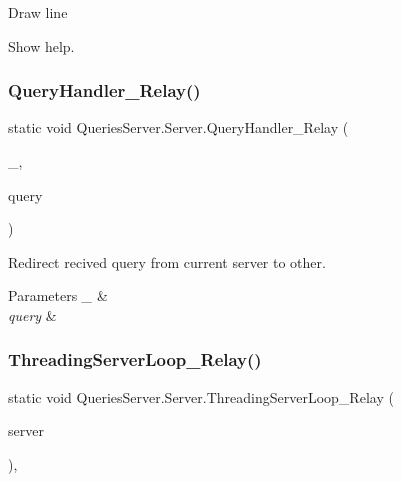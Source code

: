 Draw line

Show help. \mbox{\label{class_queries_server_1_1_server_af23657bf1fbf254abb46ed80180b0cc3}} 
\subsubsection{\texorpdfstring{Query\+Handler\+\_\+\+Relay()}{QueryHandler\_Relay()}}
{\footnotesize\ttfamily static void Queries\+Server.\+Server.\+Query\+Handler\+\_\+\+Relay (\begin{DoxyParamCaption}\item[{\mbox{\hyperlink{class_pipes_provider_1_1_server_1_1_transmission_controllers_1_1_base_server_transmission_controller}{Base\+Server\+Transmission\+Controller}}}]{\+\_\+,  }\item[{string}]{query }\end{DoxyParamCaption})\hspace{0.3cm}{\ttfamily [static]}}



Redirect recived query from current server to other. 


\begin{DoxyParams}{Parameters}
{\em \+\_\+} & \\
\hline
{\em query} & \\
\hline
\end{DoxyParams}
\mbox{\label{class_queries_server_1_1_server_af78ec354d7f465d29800f812996dc91b}} 
\subsubsection{\texorpdfstring{Threading\+Server\+Loop\+\_\+\+Relay()}{ThreadingServerLoop\_Relay()}}
{\footnotesize\ttfamily static void Queries\+Server.\+Server.\+Threading\+Server\+Loop\+\_\+\+Relay (\begin{DoxyParamCaption}\item[{object}]{server }\end{DoxyParamCaption})\hspace{0.3cm}{\ttfamily [static]}, {\ttfamily [protected]}}



